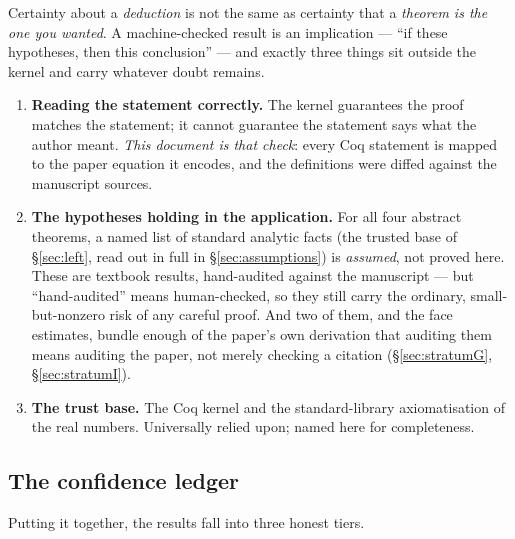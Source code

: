 \documentclass[11pt]{article}
\newcommand{\coq}[1]{\texttt{\detokenize{#1}}}
\begin{document}
Certainty about a \emph{deduction} is not the same as certainty that a
\emph{theorem is the one you wanted}. A machine-checked result is an
implication --- ``if these hypotheses, then this conclusion'' --- and exactly
three things sit outside the kernel and carry whatever doubt remains.

\begin{enumerate}[leftmargin=1.6em]
  \item \textbf{Reading the statement correctly.} The kernel guarantees the
    proof matches the statement; it cannot guarantee the statement says what the
    author meant. \emph{This document is that check}: every Coq statement is
    mapped to the paper equation it encodes, and the definitions were diffed
    against the manuscript sources.
  \item \textbf{The hypotheses holding in the application.} For all four
    abstract theorems, a named list of standard analytic facts (the trusted base
    of \S\ref{sec:left}, read out in full in \S\ref{sec:assumptions}) is
    \emph{assumed}, not proved here. These are textbook results, hand-audited
    against the manuscript --- but ``hand-audited'' means human-checked, so they
    still carry the ordinary, small-but-nonzero risk of any careful proof. And
    two of them, \coq{Horth} and the face estimates, bundle enough of the paper's
    own derivation that auditing them means auditing the paper, not merely
    checking a citation (\S\ref{sec:stratumG}, \S\ref{sec:stratumI}).
  \item \textbf{The trust base.} The Coq kernel and the standard-library
    axiomatisation of the real numbers. Universally relied upon; named here for
    completeness.
\end{enumerate}

\subsection{The confidence ledger}

Putting it together, the results fall into three honest tiers.
\end{document}
